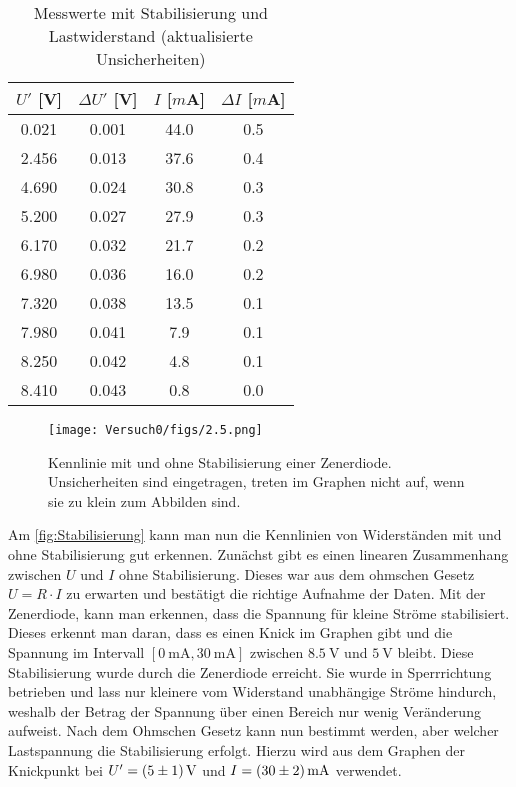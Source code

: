 \documentclass{article}
\begin{document}
\begin{table}[h!]
\centering
\begin{tabular}{|c|c|c|c|}
\hline
\textbf{$U'$ [V]} & \textbf{$\Delta U'$ [V]} & \textbf{$I$ [$m$A]} & \textbf{$\Delta I$ [$m$A]} \\
\hline
0.021 & 0.001 & 44.0 & 0.5 \\
2.456 & 0.013 & 37.6 & 0.4 \\
4.690 & 0.024 & 30.8 & 0.3 \\
5.200 & 0.027 & 27.9 & 0.3 \\
6.170 & 0.032 & 21.7 & 0.2 \\
6.980 & 0.036 & 16.0 & 0.2 \\
7.320 & 0.038 & 13.5 & 0.1 \\
7.980 & 0.041 & 7.9 & 0.1 \\
8.250 & 0.042 & 4.8 & 0.1 \\
8.410 & 0.043 & 0.8 & 0.0 \\
\hline
\end{tabular}
\caption{Messwerte mit Stabilisierung und Lastwiderstand (aktualisierte Unsicherheiten)}
\label{tab:Stabilisierung_mit_Fehlern}
\end{table}


\begin{figure}[H]
             \centering
             \texttt{[image: Versuch0/figs/2.5.png]}
             \caption{Kennlinie mit und ohne Stabilisierung einer Zenerdiode. Unsicherheiten sind eingetragen, treten im Graphen nicht auf, wenn sie zu klein zum Abbilden sind.}
             \label{fig:Stabilisierung}
         \end{figure}
         
         
Am \autoref{fig:Stabilisierung} kann man nun die Kennlinien von Widerständen mit und ohne Stabilisierung gut erkennen. Zunächst gibt es einen linearen Zusammenhang zwischen $U$ und $I$ ohne Stabilisierung. Dieses war aus dem ohmschen Gesetz $U= R \cdot I$ zu erwarten und bestätigt die richtige Aufnahme der Daten. Mit der Zenerdiode, kann man erkennen, dass die Spannung für kleine Ströme stabilisiert. Dieses erkennt man daran, dass es einen Knick im Graphen gibt und die Spannung im Intervall $[\SI{0}{\milli \ampere}, \SI{30}{\milli \ampere}]$ zwischen $\SI{8.5}{\volt}$ und $\SI{5}{\volt}$ bleibt. Diese Stabilisierung wurde durch die Zenerdiode erreicht. Sie wurde in Sperrrichtung betrieben und lass nur kleinere vom Widerstand unabhängige Ströme hindurch, weshalb der Betrag der Spannung über einen Bereich nur wenig Veränderung aufweist. Nach dem Ohmschen Gesetz kann nun bestimmt werden, aber welcher Lastspannung die Stabilisierung erfolgt. Hierzu wird aus dem Graphen der Knickpunkt bei $U' = \SI{5\pm 1}{\volt}$ und $I = \SI{30 \pm 2}{\milli \ampere}$ verwendet.
\end{document}
